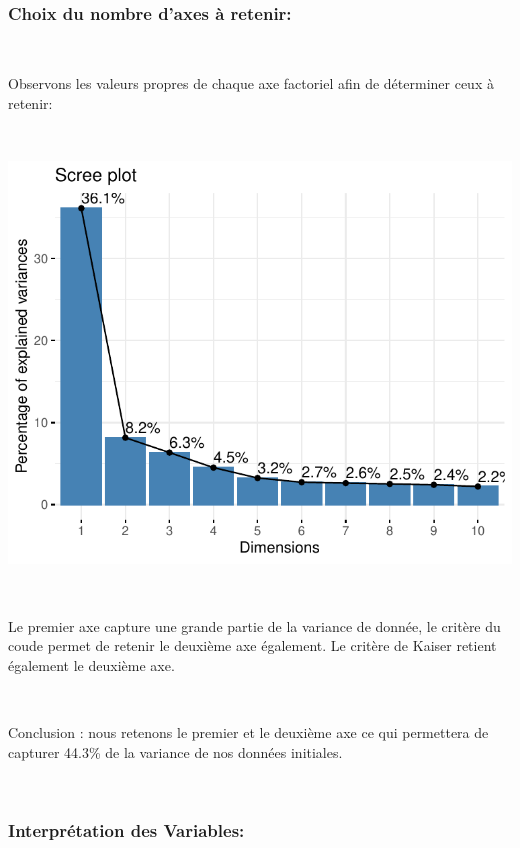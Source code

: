 \documentclass[]{imsart}
\numberwithin{equation}{section}
\theoremstyle{plain}
\begin{document}
~

\hypertarget{choix-du-nombre-daxes-uxe0-retenir}{%
\subsubsection{Choix du nombre d'axes à retenir:}\label{choix-du-nombre-daxes-uxe0-retenir}}

~

Observons les valeurs propres de chaque axe factoriel afin de déterminer ceux à retenir:

~

\begin{flushleft}\includegraphics{Analyse_Exploratoire_Projet_files/figure-latex/unnamed-chunk-13-1} \end{flushleft}

~

Le premier axe capture une grande partie de la variance de donnée, le critère du coude permet de retenir le deuxième axe également. Le critère de Kaiser retient également le deuxième axe.

~

Conclusion : nous retenons le premier et le deuxième axe ce qui permettera de capturer 44.3\% de la variance de nos données initiales.

~

\hypertarget{interpruxe9tation-des-variables}{%
\subsubsection{Interprétation des Variables:}\label{interpruxe9tation-des-variables}}
\end{document}
